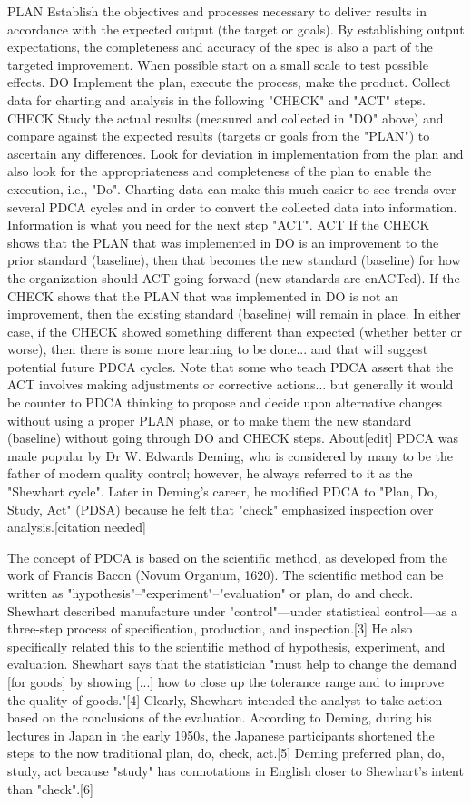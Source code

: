 PLAN
Establish the objectives and processes necessary to deliver results in accordance with the expected output (the target or goals). By establishing output expectations, the completeness and accuracy of the spec is also a part of the targeted improvement. When possible start on a small scale to test possible effects.
DO
Implement the plan, execute the process, make the product. Collect data for charting and analysis in the following "CHECK" and "ACT" steps.
CHECK
Study the actual results (measured and collected in "DO" above) and compare against the expected results (targets or goals from the "PLAN") to ascertain any differences. Look for deviation in implementation from the plan and also look for the appropriateness and completeness of the plan to enable the execution, i.e., "Do". Charting data can make this much easier to see trends over several PDCA cycles and in order to convert the collected data into information. Information is what you need for the next step "ACT".
ACT
If the CHECK shows that the PLAN that was implemented in DO is an improvement to the prior standard (baseline), then that becomes the new standard (baseline) for how the organization should ACT going forward (new standards are enACTed). If the CHECK shows that the PLAN that was implemented in DO is not an improvement, then the existing standard (baseline) will remain in place. In either case, if the CHECK showed something different than expected (whether better or worse), then there is some more learning to be done... and that will suggest potential future PDCA cycles. Note that some who teach PDCA assert that the ACT involves making adjustments or corrective actions... but generally it would be counter to PDCA thinking to propose and decide upon alternative changes without using a proper PLAN phase, or to make them the new standard (baseline) without going through DO and CHECK steps.
About[edit]
PDCA was made popular by Dr W. Edwards Deming, who is considered by many to be the father of modern quality control; however, he always referred to it as the "Shewhart cycle". Later in Deming's career, he modified PDCA to "Plan, Do, Study, Act" (PDSA) because he felt that "check" emphasized inspection over analysis.[citation needed]

The concept of PDCA is based on the scientific method, as developed from the work of Francis Bacon (Novum Organum, 1620). The scientific method can be written as "hypothesis"–"experiment"–"evaluation" or plan, do and check. Shewhart described manufacture under "control"—under statistical control—as a three-step process of specification, production, and inspection.[3] He also specifically related this to the scientific method of hypothesis, experiment, and evaluation. Shewhart says that the statistician "must help to change the demand [for goods] by showing [...] how to close up the tolerance range and to improve the quality of goods."[4] Clearly, Shewhart intended the analyst to take action based on the conclusions of the evaluation. According to Deming, during his lectures in Japan in the early 1950s, the Japanese participants shortened the steps to the now traditional plan, do, check, act.[5] Deming preferred plan, do, study, act because "study" has connotations in English closer to Shewhart's intent than "check".[6]

